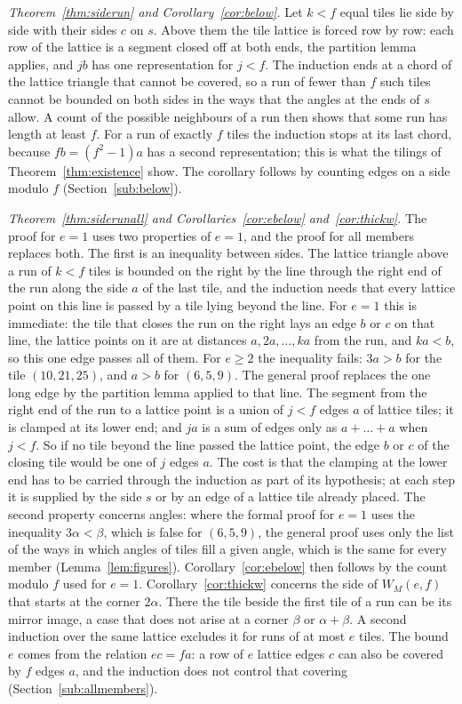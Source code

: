 \documentclass[11pt,reqno]{amsart}
\theoremstyle{plain}
\theoremstyle{definition}
\begin{document}
\emph{Theorem~\ref{thm:siderun} and Corollary~\ref{cor:below}.} Let $k<f$ equal tiles lie side by side with
their sides $c$ on $s$. Above them the tile lattice is forced row by row: each row of the lattice is a
segment closed off at both ends, the partition lemma applies, and $jb$ has one representation for $j<f$. The
induction ends at a chord of the lattice triangle that cannot be covered, so a run of fewer than $f$ such
tiles cannot be bounded on both sides in the ways that the angles at the ends of $s$ allow. A count of the
possible neighbours of a run then shows that some run has length at least $f$. For a run of exactly $f$
tiles the induction stops at its last chord, because $fb=(f^2-1)a$ has a second representation; this is what
the tilings of Theorem~\ref{thm:existence} show. The corollary follows by counting edges on a side modulo
$f$ (Section~\ref{sub:below}).

\emph{Theorem~\ref{thm:siderunall} and Corollaries~\ref{cor:ebelow} and~\ref{cor:thickw}.} The proof for
$e=1$ uses two properties of $e=1$, and the proof for all members replaces both. The first is an
inequality between sides. The lattice triangle above a run of $k<f$ tiles is
bounded on the right by the line through the right end of the run along the side $a$ of the last tile, and
the induction needs that every lattice point on this line is passed by a tile lying beyond the line. For
$e=1$ this is immediate: the tile that closes the run on the right lays an edge $b$ or $c$ on that line, the
lattice points on it are at distances $a,2a,\dots,ka$ from the run, and $ka<b$, so this one edge passes all
of them. For $e\ge2$ the inequality fails: $3a>b$ for the tile $(10,21,25)$, and $a>b$ for $(6,5,9)$. The
general proof replaces the one long edge by the partition lemma applied to that line. The segment from the
right end of the run to a lattice point is a union of $j<f$ edges $a$ of lattice tiles; it is clamped at its
lower end; and $ja$ is a sum of edges only as $a+\dots+a$ when $j<f$. So if no tile beyond the line passed
the lattice point, the edge $b$ or $c$ of the closing tile would be one of $j$ edges $a$. The cost is that
the clamping at the lower end has to be carried through the induction as part of its hypothesis; at each
step it is supplied by the side $s$ or by an edge of a lattice tile already placed. The second property
concerns angles: where the formal proof for $e=1$ uses the inequality $3\alpha<\beta$, which is false for
$(6,5,9)$, the general proof uses only the list of the ways in which angles of tiles fill a given angle,
which is the same for every member (Lemma~\ref{lem:figures}). Corollary~\ref{cor:ebelow} then follows by the
count modulo $f$ used for $e=1$. Corollary~\ref{cor:thickw} concerns the side of $W_M(e,f)$ that starts at
the corner $2\alpha$. There the tile beside the first tile of a run can be its mirror image, a case that
does not arise at a corner $\beta$ or $\alpha+\beta$. A second induction over the same lattice excludes it
for runs of at most $e$ tiles. The bound $e$ comes from the relation $ec=fa$: a row of $e$ lattice edges $c$
can also be covered by $f$ edges $a$, and the induction does not control that covering
(Section~\ref{sub:allmembers}).
\end{document}
